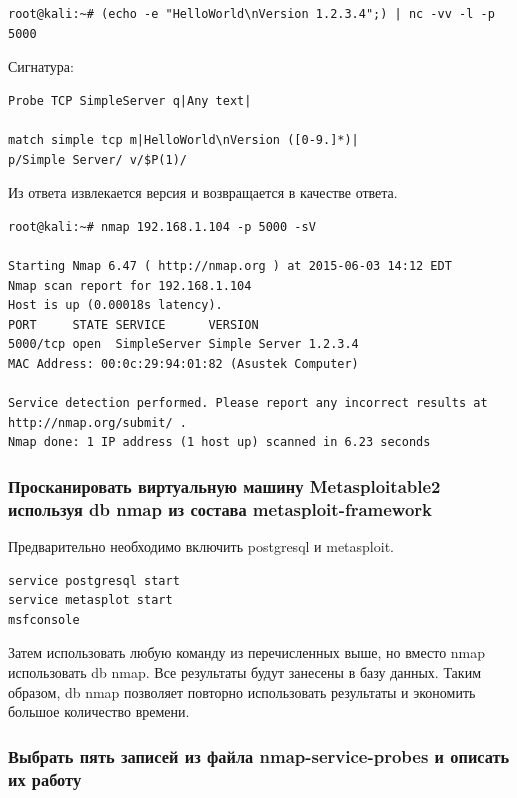 \documentclass[10pt,a4paper]{article}
\begin{document}
\begin{verbatim}
root@kali:~# (echo -e "HelloWorld\nVersion 1.2.3.4";) | nc -vv -l -p 5000
\end{verbatim}

Сигнатура: 

\begin{verbatim}
Probe TCP SimpleServer q|Any text|

match simple tcp m|HelloWorld\nVersion ([0-9.]*)|
p/Simple Server/ v/$P(1)/
\end{verbatim}

Из ответа извлекается версия и возвращается в качестве ответа.

\begin{lstlisting}
root@kali:~# nmap 192.168.1.104 -p 5000 -sV

Starting Nmap 6.47 ( http://nmap.org ) at 2015-06-03 14:12 EDT
Nmap scan report for 192.168.1.104
Host is up (0.00018s latency).
PORT     STATE SERVICE      VERSION
5000/tcp open  SimpleServer Simple Server 1.2.3.4
MAC Address: 00:0c:29:94:01:82 (Asustek Computer)

Service detection performed. Please report any incorrect results at 
http://nmap.org/submit/ .
Nmap done: 1 IP address (1 host up) scanned in 6.23 seconds
\end{lstlisting}

\subsubsection{Просканировать виртуальную машину Metasploitable2 используя db nmap из состава metasploit-framework}

Предварительно необходимо включить postgresql и metasploit.

\begin{verbatim}
service postgresql start
service metasplot start
msfconsole
\end{verbatim}

Затем использовать любую команду из перечисленных выше, но вместо nmap использовать db nmap. Все результаты будут занесены в базу данных. Таким образом, db nmap позволяет повторно использовать результаты и экономить большое количество времени.

\subsubsection{Выбрать пять записей из файла nmap-service-probes и описать их работу}
\end{document}
